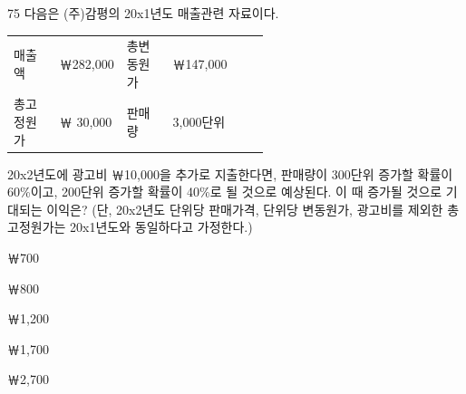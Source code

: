 \begin{question}{75}
다음은 (주)감평의 20x1년도 매출관련 자료이다.
\begin{framedtext}
\begin{tabular}{@{}p{0.18\linewidth}p{0.2\linewidth}p{0.18\linewidth}l@{}}
매출액 & ￦282,000 & 총변동원가 & ￦147,000 \\
총고정원가 & ￦ 30,000 & 판매량 & 3,000단위 \\
\end{tabular}
\end{framedtext}
20x2년도에 광고비 ￦10,000을 추가로 지출한다면, 판매량이 300단위 증가할 확률이 60\%이고, 200단위 증가할 확률이 40\%로 될 것으로 예상된다. 이 때 증가될 것으로 기대되는 이익은? (단, 20x2년도 단위당 판매가격, 단위당 변동원가, 광고비를 제외한 총고정원가는 20x1년도와 동일하다고 가정한다.) \par
\begin{choices}
  \item ￦700
  \item ￦800
  \item ￦1,200
  \item ￦1,700
  \item ￦2,700
\end{choices}
\end{question}
